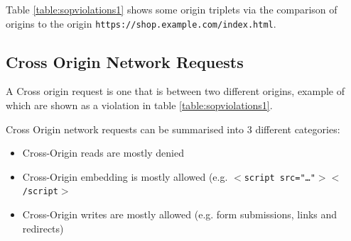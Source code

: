 \documentclass{mscreport}
\begin{document}
\vspace{0.3cm}
\noindent
Table \ref{table:sopviolations1} shows some origin triplets via the comparison of origins to the origin \newline \texttt{https://shop.example.com/index.html}.

\begin{table}[h!]
  \begin{center}
    \caption{Same Origin triplet example violations}
    \label{table:sopviolations1} %
  \end{center}
\end{table}

\subsection{Cross Origin Network Requests}
A Cross origin request is one that is between two different origins, example of which are shown as a violation in table \ref{table:sopviolations1}.

\vspace{0.3cm}
\noindent
Cross Origin network requests can be summarised into 3 different categories:
\begin{itemize}
	\setlength\itemsep{0.1em}
	\item Cross-Origin reads are mostly denied
	\item Cross-Origin embedding is mostly allowed (e.g. \texttt{$<$script src="…"$><$/script$>$}
	\item Cross-Origin writes are mostly allowed (e.g. form submissions, links and redirects)
\end{itemize}
\end{document}
